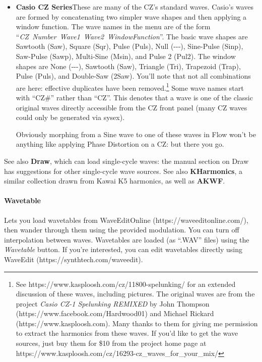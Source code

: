\documentclass{article}
\begin{document}
\begin{itemize}
\item{\bf Casio CZ Series}\quad These are many of the CZ's standard waves.  Casio's waves are formed by concatenating two simpler wave shapes and then applying a window function.  The wave names in the menu are of the form ``\mbox{\it CZ Number Wave1 Wave2 WindowFunction}''.  The basic wave shapes are Sawtooth (Saw), Square (Sqr), Pulse (Puls), Null (-{}-{}-), Sine-Pulse (Sinp), Saw-Pulse (Sawp), Multi-Sine (Msin), and Pulse 2 (Pul2).  The window shapes are None (-{}-{}-), Sawtooth (Saw), Triangle (Tri), Trapezoid (Trap), Pulse (Puls), and Double-Saw (2Saw).  You'll note that not all combinations are here: effective duplicates have been removed.\footnote{See https:/\!/www.kasploosh.com/cz/11800-spelunking/ for an extended discussion of these waves, including pictures.  The original waves are from the project {\it Casio CZ-1 Spelunking REMIXED} by John Thompson (https:/\!/www.facebook.com/Hardwood01) and Michael Rickard  (https:/\!/www.kasploosh.com).  Many thanks to them for giving me permission to extract the harmonics from these waves.  If you'd like to get the wave sources, just buy them for \$10 from the project home page at https:/\!/www.kasploosh.com/cz/16293-cz\_waves\_for\_your\_mix/}  Some wave names start with ``CZ\#'' rather than ``CZ''.  This denotes that a wave is one of the classic original waves directly accessible from the CZ front panel (many CZ waves could only be generated via sysex).

Obviously morphing from a Sine wave to one of these waves in Flow won't be anything like applying Phase Distortion on a CZ: but there you go.
\end{itemize}

See also {\bf Draw}, which can load single-cycle waves: the manual section on Draw has suggestions for other single-cycle wave sources.  See also {\bf KHarmonics}, a similar collection drawn from Kawai K5 harmonics, as well as {\bf AKWF}.

\paragraph{Wavetable}  Lets you load wavetables from WaveEditOnline (https:/\!/waveeditonline.com/), then wander through them using the provided modulation.  You can turn off interpolation between waves.  Wavetables are loaded (as ``.WAV'' files) using the {\it Wavetable} button.  If you're interested, you can edit wavetables directly using WaveEdit (https:/\!/synthtech.com/waveedit).
\end{document}
